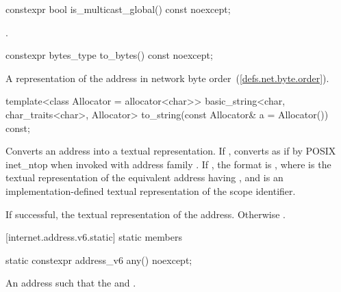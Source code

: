 \begin{itemdecl}
constexpr bool is_multicast_global() const noexcept;
\end{itemdecl}

\begin{itemdescr}
\pnum
\returns {}.
\end{itemdescr}

\begin{itemdecl}
constexpr bytes_type to_bytes() const noexcept;
\end{itemdecl}

\begin{itemdescr}
\pnum
\returns A representation of the address in network byte order~(\ref{defs.net.byte.order}).
\end{itemdescr}

\begin{itemdecl}
template<class Allocator = allocator<char>>
  basic_string<char, char_traits<char>, Allocator>
    to_string(const Allocator& a = Allocator()) const;
\end{itemdecl}

\begin{itemdescr}
\pnum
\effects Converts an address into a textual representation. If , converts as if by POSIX inet_ntop when invoked with address family . If , the format is \tcode{\%}, where  is the textual representation of the equivalent address having , and  is an implementation-defined textual representation of the scope identifier.

\pnum
\returns If successful, the textual representation of the address. Otherwise .
\end{itemdescr}



[internet.address.v6.static]{ static members}

\begin{itemdecl}
static constexpr address_v6 any() noexcept;
\end{itemdecl}

\begin{itemdescr}
\pnum
\returns An address  such that the  and .
\end{itemdescr}

